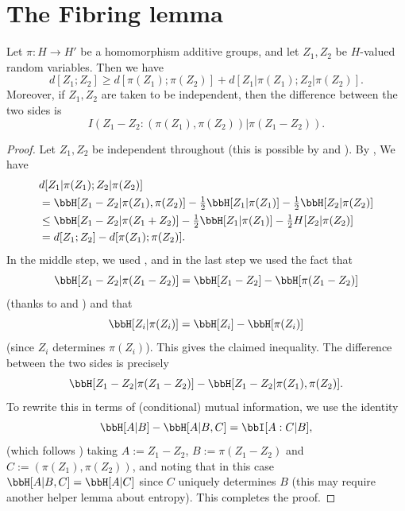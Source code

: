 \chapter{The Fibring lemma}

\begin{proposition}\label{fibring-ident}
  \leanok
  Let $\pi : H \to H'$ be a homomorphism additive groups, and let $Z_1,Z_2$ be $H$-valued random variables. Then we have
  \[
    d[Z_1; Z_2] \geq d[\pi(Z_1);\pi(Z_2)] + d[Z_1|\pi(Z_1); Z_2 |\pi(Z_2)].
  \]
  Moreover, if $Z_1,Z_2$ are taken to be independent, then the difference between the two sides is
$$I( Z_1 - Z_2 : (\pi(Z_1), \pi(Z_2))  |  \pi(Z_1 - Z_2) ).$$
\end{proposition}


\begin{proof}\leanok
  Let $Z_1,Z_2$ be independent throughout (this is possible by  and ).  By , We have
  \begin{align*}
    & d[Z_1  |\pi(Z_1); Z_2 |\pi(Z_2)] \\
    & = \bbH[Z_1 - Z_2 | \pi(Z_1),\pi(Z_2)] - \tfrac{1}{2} \bbH[Z_1 | \pi(Z_1)] - \tfrac{1}{2} \bbH[Z_2 | \pi(Z_2)] \\
    & \leq  \bbH[Z_1 - Z_2 | \pi(Z_1+Z_2)]  - \tfrac{1}{2} \bbH[Z_1 | \pi(Z_1)] - \tfrac{1}{2}H[Z_2 | \pi(Z_2)] \\
    & = d[Z_1;Z_2] - d[\pi(Z_1);\pi(Z_2)].
  \end{align*}
  In the middle step, we used , and in the last step we used the fact that
  \[\bbH[Z_1 - Z_2 |  \pi(Z_1-Z_2)] = \bbH[Z_1 - Z_2] - \bbH[\pi(Z_1-Z_2)]\]
  (thanks to  and ) and that
  \[\bbH[Z_i| \pi(Z_i)] = \bbH[Z_i] - \bbH[\pi(Z_i)]\] (since $Z_i$ determines $\pi(Z_i)$).
  This gives the claimed inequality. The difference between the two sides is precisely
  \[\bbH[Z_1 - Z_2  | \pi(Z_1 - Z_2)] - \bbH[Z_1 - Z_2  | \pi(Z_1),\pi(Z_2)].\]
  To rewrite this in terms of (conditional) mutual information, we use the identity
  \[\bbH[A|B] - \bbH[A | B,C] = \bbI[A : C | B],\]
  (which follows )
  taking
  $A := Z_1 - Z_2$, $B := \pi(Z_1 - Z_2)$ and $C := (\pi(Z_1),\pi(Z_{2}))$, and noting that in this case $\bbH[A | B,C] = \bbH[A | C]$ since $C$ uniquely determines $B$ (this may require another helper lemma about entropy).
  This completes the proof.
\end{proof}


